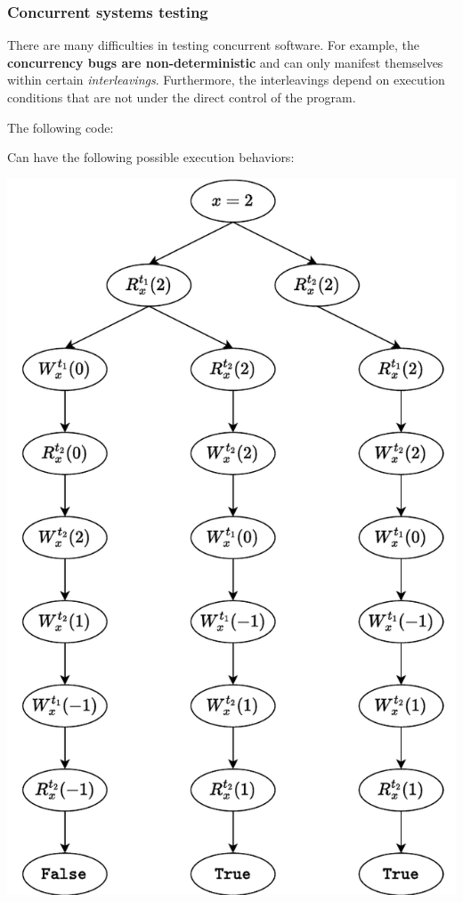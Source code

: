 \newpage

\subsubsection{Concurrent systems testing}

There are many difficulties in testing concurrent software. For example, the \textbf{concurrency bugs are non-deterministic} and can only manifest themselves within certain \emph{interleavings}. Furthermore, the interleavings depend on execution conditions that are not under the direct control of the program.

\begin{examplebox}
    The following code:
    
    Can have the following possible execution behaviors:
    \begin{center}
        \includegraphics[width=.6\textwidth]{img/different-interleavings-2.pdf}
    \end{center}
\end{examplebox}

\newpage

\begin{examplebox}
    
\end{examplebox}

\begin{examplebox}
    
\end{examplebox}

